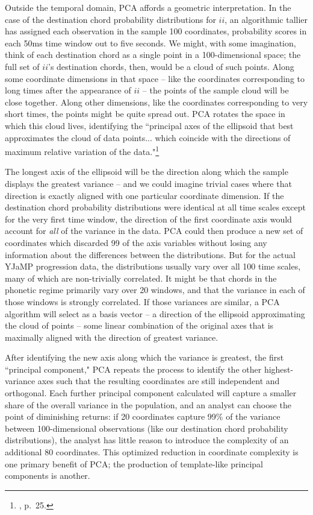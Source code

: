 Outside the temporal domain, PCA affords a geometric interpretation.  In the case of the destination chord probability distributions for $ii$, an algorithmic tallier has assigned each observation in the sample 100 coordinates, probability scores in each 50ms time window out to five seconds.  We might, with some imagination, think of each destination chord as a single point in a 100-dimensional space; the full set of $ii$'s destination chords, then, would be a cloud of such points.  Along some coordinate dimensions in that space -- like the coordinates corresponding to long times after the appearance of $ii$ -- the points of the sample cloud will be close together.  Along other dimensions, like the coordinates corresponding to very short times, the points might be quite spread out.  PCA rotates the space in which this cloud lives, identifying the ``principal axes of the ellipsoid that best approximates the cloud of data points... which coincide with the directions of maximum relative variation of the data."\footnote{\cite{benadon2015}, p.\ 25.}

The longest axis of the ellipsoid will be the direction along which the sample displays the greatest variance -- and we could imagine trivial cases where that direction is exactly aligned with one particular coordinate dimension.  If the destination chord probability distributions were identical at all time scales except for the very first time window, the direction of the first coordinate axis would account for \emph{all} of the variance in the data.  PCA could then produce a new set of coordinates which discarded 99 of the axis variables without losing any information about the differences between the distributions.  But for the actual YJaMP progression data, the distributions usually vary over all 100 time scales, many of which are non-trivially correlated.  It might be that chords in the phonetic regime primarily vary over 20 windows, and that the variance in each of those windows is strongly correlated.  If those variances are similar, a PCA algorithm will select as a basis vector -- a direction of the ellipsoid approximating the cloud of points -- some linear combination of the original axes that is maximally aligned with the direction of greatest variance.

After identifying the new axis along which the variance is greatest, the first ``principal component," PCA repeats the process to identify the other highest-variance axes such that the resulting coordinates are still independent and orthogonal.  Each further principal component calculated will capture a smaller share of the overall variance in the population, and an analyst can choose the point of diminishing returns: if 20 coordinates capture 99\% of the variance between 100-dimensional observations (like our destination chord probability distributions), the analyst has little reason to introduce the complexity of an additional 80 coordinates.  This optimized reduction in coordinate complexity is one primary benefit of PCA; the production of template-like principal components is another.

